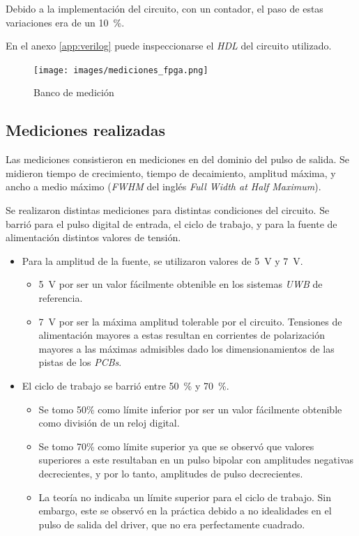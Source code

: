 Debido a la implementación del circuito, con un contador, el paso de estas
variaciones era de un \qty{10}{\percent}.

En el anexo \ref{app:verilog} puede inspeccionarse el \textit{HDL} del circuito utilizado.

\begin{figure}
  \centering
    \texttt{[image: images/mediciones\_fpga.png]}
    \caption{Banco de medición}
    \label{fig:mediciones_fpga}
\end{figure}

\subsection{Mediciones realizadas}

Las mediciones consistieron en mediciones en del dominio del pulso de salida. Se
midieron tiempo de crecimiento, tiempo de decaimiento, amplitud máxima, y ancho
a medio máximo (\textit{FWHM} del inglés \textit{Full Width at Half Maximum}).

Se realizaron distintas mediciones para distintas condiciones del circuito. Se
barrió para el pulso digital de entrada, el ciclo de trabajo, y para la fuente
de alimentación distintos valores de tensión.

\begin{itemize}
    \item Para la amplitud de la fuente, se utilizaron valores de \qty{5}{\volt} y
        \qty{7}{\volt}.
        \begin{itemize}
            \item \qty{5}{\volt} por ser un valor fácilmente obtenible en los
                sistemas \textit{UWB} de referencia.
            \item \qty{7}{\volt} por ser la máxima amplitud tolerable por el circuito.
                Tensiones de alimentación mayores a estas resultan en corrientes de
                polarización mayores a las máximas admisibles dado los
                dimensionamientos de las pistas de los \textit{PCBs}.
        \end{itemize}
    \item El ciclo de trabajo se barrió entre \qty{50}{\percent} y
        \qty{70}{\percent}.
        \begin{itemize}
            \item Se tomo 50\% como límite inferior por ser un valor fácilmente
                obtenible como división de un reloj digital.
            \item Se tomo 70\% como límite superior ya que se observó que valores
                superiores a este resultaban en un pulso bipolar con amplitudes
                negativas decrecientes, y por lo tanto, amplitudes de pulso
                decrecientes.
            \item La teoría no indicaba un límite superior para el ciclo de
                trabajo. Sin embargo, este se observó en la práctica debido a no
                idealidades en el pulso de salida del driver, que no era
                perfectamente cuadrado.
        \end{itemize}
\end{itemize}

